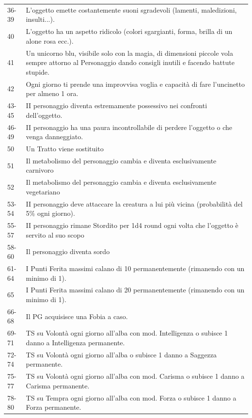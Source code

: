 \begin{tabularx}{\linewidth}{lX}
36-39 & L'oggetto emette costantemente suoni sgradevoli (lamenti, maledizioni, insulti...).\\
\rowcolor{gray!20}40& L'oggetto ha un aspetto ridicolo (colori sgargianti, forma, brilla di un alone rosa ecc.).\\
41& Un unicorno blu, visibile solo con la magia, di dimensioni piccole vola sempre attorno al Personaggio dando consigli inutili e facendo battute stupide.\\
\rowcolor{gray!20}42& Ogni giorno ti prende una improvvisa voglia e capacità di fare l'uncinetto per almeno 1 ora.\\
43-45 & II personaggio diventa estremamente possessivo nei confronti dell'oggetto.\\
\rowcolor{gray!20}46-49 & II personaggio ha una paura incontrollabile di perdere l'oggetto o che venga danneggiato.\\
50& Un Tratto viene sostituito\\
\rowcolor{gray!20}51& Il metabolismo del personaggio cambia e diventa esclusivamente carnivoro\\
52& Il metabolismo del personaggio cambia e diventa esclusivamente vegetariano\\
\rowcolor{gray!20}53-54 & II personaggio deve attaccare la creatura a lui più vicina (probabilità del 5\% ogni giorno).\\
55-57 & II personaggio rimane Stordito per 1d4 round ogni volta che l'oggetto è servito al suo scopo\\
\rowcolor{gray!20}58-60 & Il personaggio diventa sordo\\
61-64 & I Punti Ferita massimi calano di 10 permanentemente (rimanendo con un minimo di 1).\\
\rowcolor{gray!20}65& I Punti Ferita massimi calano di 20 permanentemente (rimanendo con un minimo di 1).\\
66-68 & Il PG acquisisce una Fobia a caso.\\
\rowcolor{gray!20}69-71 & TS su Volontà ogni giorno all'alba con mod. Intelligenza o subisce 1 danno a Intelligenza permanente.\\
72-74 & TS su Volontà ogni giorno all'alba o subisce 1 danno a Saggezza permanente.\\
\rowcolor{gray!20}75-77 & TS su Volontà ogni giorno all'alba con mod. Carisma o subisce 1 danno a Carisma permanente.\\
78-80 & TS su Tempra ogni giorno all'alba con mod. Forza o subisce 1 danno a Forza permanente.\\

\end{tabularx}

